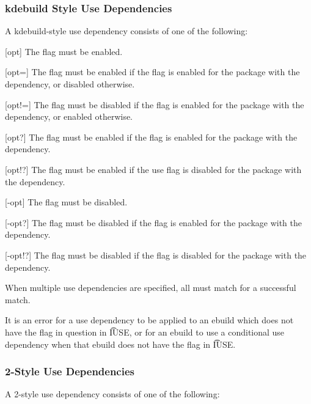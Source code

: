 \IFKDEBUILDELSE
{
    \subsubsection{kdebuild Style Use Dependencies}
    \label{kdebuild-use-dep}

    A kdebuild-style use dependency consists of one of the following:

    \begin{description}
    \item{[opt]} The flag must be enabled.
    \item{[opt=]} The flag must be enabled if the flag is enabled for the package with the
        dependency, or disabled otherwise.
    \item{[opt!=]} The flag must be disabled if the flag is enabled for the package with the
        dependency, or enabled otherwise.
    \item{[opt?]} The flag must be enabled if the flag is enabled for the package with the
        dependency.
    \item{[opt!?]} The flag must be enabled if the use flag is disabled for the package with the
        dependency.
    \item{[-opt]} The flag must be disabled.
    \item{[-opt?]} The flag must be disabled if the flag is enabled for the package with the
        dependency.
    \item{[-opt!?]} The flag must be disabled if the flag is disabled for the package with the
        dependency.
    \end{description}

    When multiple use dependencies are specified, all must match for a successful match.

    It is an error for a use dependency to be applied to an ebuild which does not have the flag in
    question in \t{IUSE}, or for an ebuild to use a conditional use dependency when that ebuild does
    not have the flag in \t{IUSE}.
}{
}

\subsubsection{2-Style Use Dependencies}
\label{use-dep}

A 2-style use dependency consists of one of the following:

